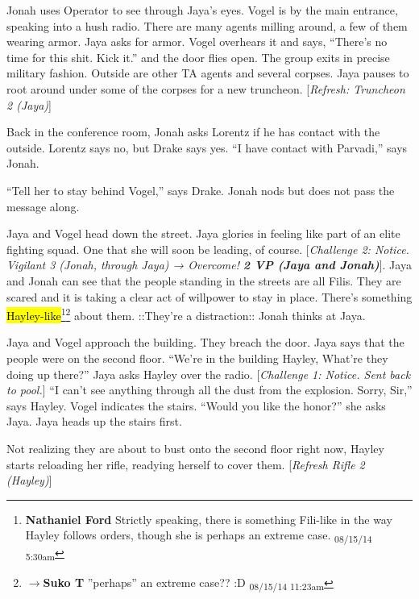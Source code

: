 Jonah uses Operator to see through Jaya's eyes.  Vogel is by the main entrance, speaking into a hush radio.  There are many agents milling around, a few of them wearing armor.  Jaya asks for armor.  Vogel overhears it and says, ``There's no time for this shit.  Kick it.'' and the door flies open.  The group exits in precise military fashion.  Outside are other TA agents and several corpses.  Jaya pauses to root around under some of the corpses for a new truncheon.  {[}\textit{Refresh: Truncheon 2 (Jaya)}{]}



Back in the conference room, Jonah asks Lorentz if he has contact with the outside.  Lorentz says no, but Drake says yes.  ``I have contact with Parvadi,'' says Jonah.  

``Tell her to stay behind Vogel,'' says Drake.   Jonah nods but does not pass the message along.



Jaya and Vogel head down the street.  Jaya glories in feeling like part of an elite fighting squad.  One that she will soon be leading, of course. {[}\textit{Challenge 2: Notice.  Vigilant 3 (Jonah, through Jaya) → Overcome! }\textit{\textbf{2 VP (Jaya and Jonah)}}{]}.  Jaya and Jonah can see that the people standing in the streets are all Filis.  They are scared and it is taking a clear act of willpower to stay in place.  There's something \hl{Hayley-like}\footnote{\textbf{Nathaniel Ford }Strictly speaking, there is something Fili-like in the way Hayley follows orders, though she is perhaps an extreme case. \textsubscript{08/15/14 5:30am}}\footnote{$\rightarrow$\textbf{Suko T }''perhaps'' an extreme case?? :D \textsubscript{08/15/14 11:23am}} about them.   {\color[RGB]{74,134,232}::They're a distraction::}  Jonah thinks at Jaya.



Jaya and Vogel approach the building.  They breach the door.  Jaya says that the people were on the second floor.  ``We're in the building Hayley, What're they doing up there?'' Jaya asks Hayley over the radio.   {[}\textit{Challenge 1: Notice.  Sent back to pool.}{]}  ``I can't see anything through all the dust from the explosion.  Sorry, Sir,'' says Hayley.   Vogel indicates the stairs.  ``Would you like the honor?'' she asks Jaya.  Jaya heads up the stairs first.



Not realizing they are about to bust onto the second floor right now, Hayley starts reloading her rifle, readying herself to cover them.  {[}\textit{Refresh Rifle 2 (Hayley)}{]}



